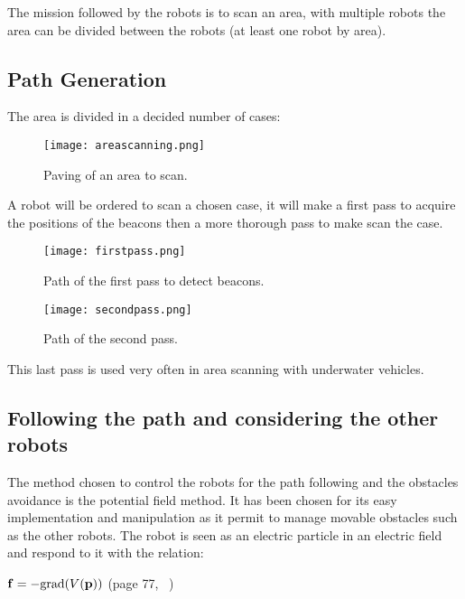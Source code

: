 The mission followed by the robots is to scan an area, with multiple robots the area can be divided between the robots (at least one robot by area).

\subsection{Path Generation}\label{ssec:pathgen}

The area is divided in a decided number of cases:

\begin{figure}[H]
\centering
\texttt{[image: areascanning.png]}
\caption{Paving of an area to scan.}
\label{fig:areaScan}
\end{figure}

A robot will be ordered to scan a chosen case, it will make a first pass to acquire the positions of the beacons then a more thorough pass to make scan the case.

\begin{figure}[H]
\centering
    \begin{minipage}[b]{0.4\textwidth}
    \texttt{[image: firstpass.png]}
    \caption{Path of the first pass to detect beacons.}
    \label{fig:firstpass}
    \end{minipage}
    \begin{minipage}[b]{0.4\textwidth}
    \texttt{[image: secondpass.png]}
    \caption{Path of the second pass.}
    \label{fig:secondpass}
    \end{minipage}
\end{figure}

This last pass is used very often in area scanning with underwater vehicles.


\subsection{Following the path and considering the other robots}

The method chosen to control the robots for the path following and the obstacles avoidance is the potential field method. It has been chosen for its easy implementation and manipulation as it permit to manage movable obstacles such as the other robots.
The robot is seen as an electric particle in an electric field and respond to it with the relation:

$\mathbf{f} = -\textnormal{grad}(V(\mathbf{p}))$ (page 77, ~\cite{jaulin2015mobile})\\


